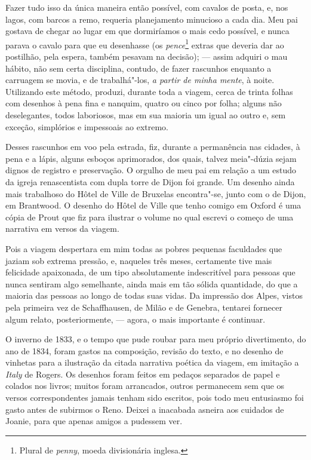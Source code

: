 Fazer tudo isso da única maneira então possível, com cavalos de posta,
e, nos lagos, com barcos a remo, requeria planejamento minucioso a cada
dia. Meu pai gostava de chegar ao lugar em que dormiríamos o mais cedo
possível, e nunca parava o cavalo para que eu desenhasse (os
\textit{pence}\footnote{Plural de \textit{penny}, moeda
  divisionária inglesa.} extras que deveria dar ao
postilhão, pela espera, também pesavam na decisão); --- assim adquiri o
mau hábito, não sem certa disciplina, contudo, de fazer rascunhos
enquanto a carruagem se movia, e de trabalhá"-los, \textit{a partir de minha
mente}, à noite. Utilizando este método, produzi, durante toda a
viagem, cerca de trinta folhas com desenhos à pena fina e nanquim,
quatro ou cinco por folha; alguns não deselegantes, todos laboriosos,
mas em sua maioria um igual ao outro e, sem exceção, simplórios e
impessoais ao extremo.

Desses rascunhos em voo pela estrada, fiz, durante a permanência nas \label{suica}
cidades, à pena e a lápis, alguns esboços aprimorados, dos quais, talvez
meia"-dúzia sejam dignos de registro e preservação. O orgulho de meu pai
em relação a um estudo da igreja renascentista com dupla torre de Dijon
foi grande. Um desenho ainda mais trabalhoso do Hôtel de Ville de
Bruxelas encontra"-se, junto com o de Dijon, em Brantwood. O desenho do
Hôtel de Ville que tenho comigo em Oxford é uma cópia de Prout que fiz
para ilustrar o volume no qual escrevi o começo de uma narrativa em
versos da viagem.

Pois a viagem despertara em mim todas as pobres pequenas faculdades que
jaziam sob extrema pressão, e, naqueles três meses, certamente tive mais
felicidade apaixonada, de um tipo absolutamente indescritível para
pessoas que nunca sentiram algo semelhante, ainda mais em tão sólida
quantidade, do que a maioria das pessoas ao longo de todas suas vidas.
Da impressão dos Alpes, vistos pela primeira vez de Schaffhausen, de
Milão e de Genebra, tentarei fornecer algum relato, posteriormente, --- 
agora, o mais importante é continuar.

O inverno de 1833, e o tempo que pude roubar para meu próprio
divertimento, do ano de 1834, foram gastos na composição, revisão do
texto, e no desenho de vinhetas para a ilustração da citada narrativa
poética da viagem, em imitação a \textit{Italy} de Rogers. Os desenhos
foram feitos em pedaços separados de papel e colados nos livros; muitos
foram arrancados, outros permanecem sem que os versos correspondentes
jamais tenham sido escritos, pois todo meu entusiasmo foi gasto antes de
subirmos o Reno. Deixei a inacabada asneira aos cuidados de Joanie, para
que apenas amigos a pudessem ver.

